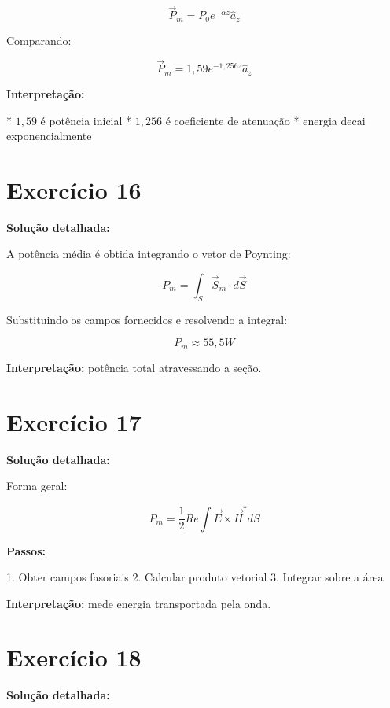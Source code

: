 \documentclass[12pt,a4paper]{article}
\begin{document}
\[
\vec{P}_m = P_0 e^{-\alpha z} \hat{a}_z
\]

Comparando:

\[
\vec{P}_m = 1{,}59 e^{-1{,}256z} \hat{a}_z
\]

\textbf{Interpretação:}

* $1{,}59$ é potência inicial
* $1{,}256$ é coeficiente de atenuação
* energia decai exponencialmente

\newpage

\section*{Exercício 16}

\textbf{Solução detalhada:}

A potência média é obtida integrando o vetor de Poynting:

\[
P_m = \int_S \vec{S}_m \cdot d\vec{S}
\]

Substituindo os campos fornecidos e resolvendo a integral:

\[
P_m \approx 55{,}5 W
\]

\textbf{Interpretação:} potência total atravessando a seção.

\newpage

\section*{Exercício 17}

\textbf{Solução detalhada:}

Forma geral:

\[
P_m = \frac{1}{2} Re \int \vec{E} \times \vec{H}^* dS
\]

\textbf{Passos:}

1. Obter campos fasoriais
2. Calcular produto vetorial
3. Integrar sobre a área

\textbf{Interpretação:} mede energia transportada pela onda.

\newpage

\section*{Exercício 18}

\textbf{Solução detalhada:}
\end{document}
